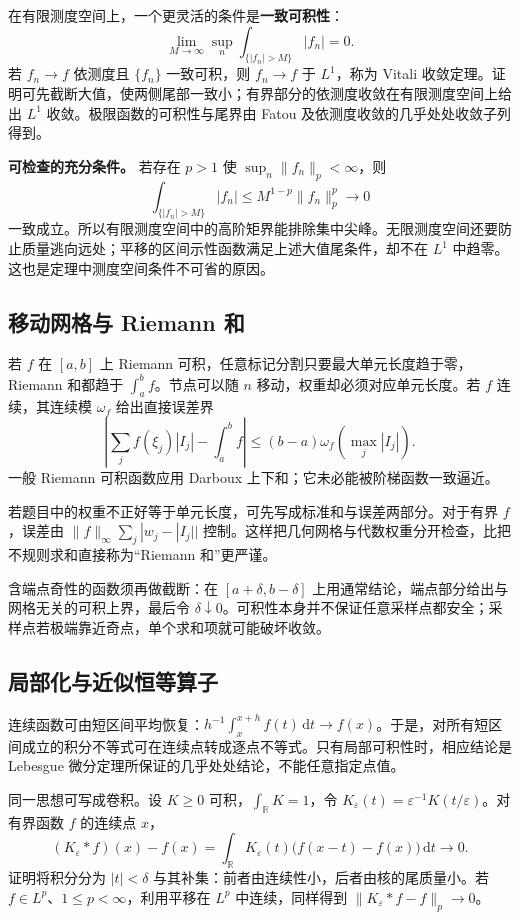 \documentclass[UTF8,12pt,a4paper,fontset=fandol]{ctexart}
\begin{document}
在有限测度空间上，一个更灵活的条件是\textbf{一致可积性}：
\[
\lim_{M\to\infty}\sup_n\int_{\{|f_n|>M\}}|f_n|=0.
\]
若 $f_n\to f$ 依测度且 $\{f_n\}$ 一致可积，则 $f_n\to f$ 于 $L^1$，称为 Vitali 收敛定理。证明可先截断大值，使两侧尾部一致小；有界部分的依测度收敛在有限测度空间上给出 $L^1$ 收敛。极限函数的可积性与尾界由 Fatou 及依测度收敛的几乎处处收敛子列得到。

\textbf{可检查的充分条件。} 若存在 $p>1$ 使 $\sup_n\|f_n\|_p<\infty$，则
\[
\int_{\{|f_n|>M\}}|f_n|\leq M^{1-p}\|f_n\|_p^p\longrightarrow0
\]
一致成立。所以有限测度空间中的高阶矩界能排除集中尖峰。无限测度空间还要防止质量逃向远处；平移的区间示性函数满足上述大值尾条件，却不在 $L^1$ 中趋零。这也是定理中测度空间条件不可省的原因。

\subsection{移动网格与 Riemann 和}

\label{app:integration-riemann}

若 $f$ 在 $[a,b]$ 上 Riemann 可积，任意标记分割只要最大单元长度趋于零，Riemann 和都趋于 $\int_a^bf$。节点可以随 $n$ 移动，权重却必须对应单元长度。若 $f$ 连续，其连续模 $\omega_f$ 给出直接误差界
\[
\left|\sum_jf(\xi_j)|I_j|-\int_a^bf\right|
\leq(b-a)\omega_f\!\left(\max_j|I_j|\right).
\]
一般 Riemann 可积函数应用 Darboux 上下和；它未必能被阶梯函数一致逼近。

若题目中的权重不正好等于单元长度，可先写成标准和与误差两部分。对于有界 $f$，误差由 $\|f\|_\infty\sum_j|w_j-|I_j||$ 控制。这样把几何网格与代数权重分开检查，比把不规则求和直接称为“Riemann 和”更严谨。

含端点奇性的函数须再做截断：在 $[a+\delta,b-\delta]$ 上用通常结论，端点部分给出与网格无关的可积上界，最后令 $\delta\downarrow0$。可积性本身并不保证任意采样点都安全；采样点若极端靠近奇点，单个求和项就可能破坏收敛。

\subsection{局部化与近似恒等算子}

\label{app:integration-local}

连续函数可由短区间平均恢复：$h^{-1}\int_x^{x+h}f(t)\,\mathrm dt\to f(x)$。于是，对所有短区间成立的积分不等式可在连续点转成逐点不等式。只有局部可积性时，相应结论是 Lebesgue 微分定理所保证的几乎处处结论，不能任意指定点值。

同一思想可写成卷积。设 $K\geq0$ 可积，$\int_{\mathbb R}K=1$，令 $K_\varepsilon(t)=\varepsilon^{-1}K(t/\varepsilon)$。对有界函数 $f$ 的连续点 $x$，
\[
(K_\varepsilon*f)(x)-f(x)
=\int_{\mathbb R}K_\varepsilon(t)\bigl(f(x-t)-f(x)\bigr)\,\mathrm dt\longrightarrow0.
\]
证明将积分分为 $|t|<\delta$ 与其补集：前者由连续性小，后者由核的尾质量小。若 $f\in L^p$、$1\leq p<\infty$，利用平移在 $L^p$ 中连续，同样得到 $\|K_\varepsilon*f-f\|_p\to0$。
\end{document}
